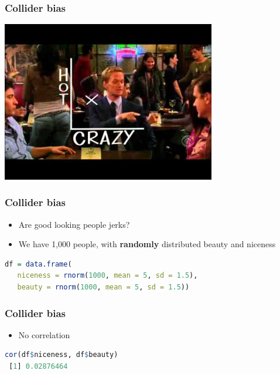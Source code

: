 \documentclass[aspectratio=43]{beamer}
\begin{document}
\begin{frame}
\frametitle{Collider bias}
\centering

\includegraphics[width = 0.7\textwidth]{../img/crazyhot}

\end{frame}


\begin{frame}[fragile]
\frametitle{Collider bias}
\centering

\begin{itemize}
  \item Are good looking people jerks?
  \item We have 1,000 people, with \textbf{randomly} distributed beauty and niceness
\end{itemize}

 \begin{lstlisting}[language=R]
 df = data.frame(
   niceness = rnorm(1000, mean = 5, sd = 1.5),
   beauty = rnorm(1000, mean = 5, sd = 1.5))
 \end{lstlisting}

\end{frame}

\begin{frame}[fragile]
\frametitle{Collider bias}
\centering

\begin{itemize}
  \item No correlation
\end{itemize}

 \begin{lstlisting}[language=R]
 cor(df$niceness, df$beauty)
 [1] 0.02876464
 \end{lstlisting}

\end{frame}
\end{document}
